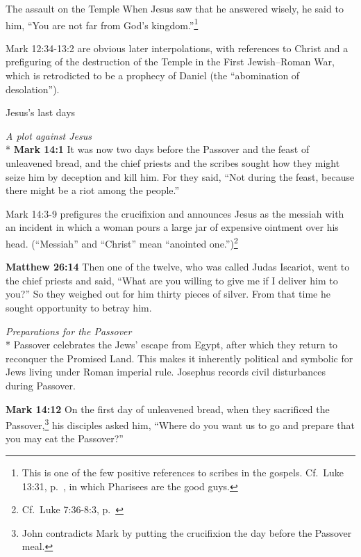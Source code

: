 \documentclass[10pt,a5paper,twoside]{article}
\newcommand{\quotesize}{\normalsize{}}
\newcommand{\comm}[1]{\begingroup \color{black!50} #1\endgroup}
\newenvironment{quotetext}{\begingroup\quotesize}{\endgroup}
\newcommand{\intex}[1]{\index[texts]{#1}}
\newcommand{\reftex}[1]{#1\intex{#1}}
\newcommand{\bible}[2]{\begin{quotetext}\textbf{#1}\intex{#1} #2\end{quotetext}}
\newcommand{\matthew}[2]{\bible{Matthew #1}{#2}}
\newcommand{\gospelmark}[2]{\bible{Mark #1}{#2}}
\newcommand{\subhead}[1]{\emph{#1}\\*}
\begin{document}
\begin{section}{The assault on the Temple}
{  When Jesus saw that he answered wisely, he said to him, ``You are not far from God's kingdom.''\footnote{This is one of the few positive references
to scribes in the gospels. Cf.~Luke 13:31, p.~\pageref{good-pharisees}, in which Pharisees are the good guys.}\label{good-scribe}
}

\comm{Mark 12:34-13:2 are obvious later interpolations, with references to Christ and a prefiguring of the destruction of the
Temple in the First Jewish–Roman War, which is retrodicted to be a prophecy of 
Daniel (the ``abomination of desolation'').}

\end{section}

\begin{section}{Jesus's last days}

\subhead{A plot against Jesus}
\gospelmark{14:1}{
It was now two days before the Passover and the feast of unleavened bread, and the chief priests and the scribes sought how they might seize him by deception and kill him.   For they said, ``Not during the feast, because there might be a riot among the people.''}

\comm{\reftex{Mark 14:3-9} prefigures the crucifixion and announces Jesus as the messiah with an incident in which a woman pours a large jar of
expensive ointment over his head. (``Messiah'' and ``Christ'' mean ``anointed one.'')\footnote{Cf.~Luke 7:36-8:3, p.~\pageref{luke-woman-anointing}}}

\matthew{26:14}{
Then one of the twelve, who was called Judas Iscariot, went to the chief priests   and said, ``What are you willing to give me if I deliver him to you?'' So they weighed out for him thirty pieces of silver.   From that time he sought opportunity to betray him.
}

\subhead{Preparations for the Passover}
\comm{Passover celebrates the Jews' escape from Egypt, after which they return to reconquer the Promised Land. This makes it
inherently political and symbolic for Jews living under Roman imperial rule. 
Josephus records civil disturbances during Passover.}

\gospelmark{14:12}{
  On the first day of unleavened bread, when they sacrificed the Passover,\footnote{John contradicts Mark by putting the crucifixion the day before
the Passover meal.}
his disciples asked him, ``Where do you want us to go and prepare that you may eat the Passover?''
}


\end{section}
\end{document}
